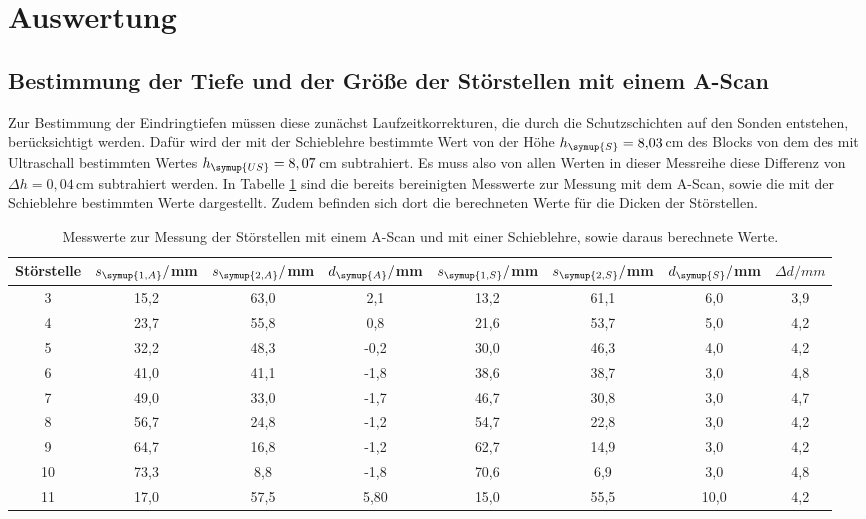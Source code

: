 \section{Auswertung}
\label{sec:Auswertung}

\subsection{Bestimmung der Tiefe und der Größe der Störstellen mit einem A-Scan}
\label{subsec:A_scan_störstellen}

Zur Bestimmung der Eindringtiefen müssen diese zunächst Laufzeitkorrekturen, die durch
die Schutzschichten auf den Sonden entstehen, berücksichtigt werden. Dafür wird der
mit der Schieblehre bestimmte Wert von der Höhe $h_{\symup{S}}=8{,}03\,$cm des Blocks
von dem des mit Ultraschall bestimmten Wertes $h_{\symup{US}}=8,07\,$cm subtrahiert.
Es muss also von allen Werten in dieser Messreihe diese Differenz von $\Delta h=0{,}04\,$cm
subtrahiert werden. In Tabelle \ref{tab:messwerte} sind die  bereits bereinigten
Messwerte zur Messung mit dem A-Scan, sowie die mit der Schieblehre bestimmten
Werte dargestellt. Zudem befinden sich dort die berechneten Werte für die Dicken
der Störstellen.

\begin{table}[htp]
	\begin{center}
    \caption{Messwerte zur Messung der Störstellen mit einem A-Scan und mit einer Schieblehre,
    sowie daraus berechnete Werte.}
    \label{tab:messwerte}
		\begin{tabular}{cccccccc}
		\toprule
			{Störstelle} & {$s_{\symup{1,A}}/$mm} & {$s_{\symup{2,A}}/$mm} & {$d_{\symup{A}}/$mm} &
      {$s_{\symup{1,S}}/$mm} & {$s_{\symup{2,S}}/$mm} & {$d_{\symup{S}}/$mm} & {$\Delta d/mm$}\\
			\midrule
			3   & 15,2 & 63,0 & 2,1 & 13,2 & 61,1 & 6,0 & 3,9\\
			4   & 23,7 & 55,8 & 0,8 & 21,6 & 53,7 & 5,0 & 4,2\\
			5   & 32,2 & 48,3 & -0,2 & 30,0 & 46,3 & 4,0 & 4,2\\
			6   & 41,0 & 41,1 & -1,8 & 38,6 & 38,7 & 3,0 & 4,8\\
			7   & 49,0 & 33,0 & -1,7 & 46,7 & 30,8 & 3,0 & 4,7\\
			8   & 56,7 & 24,8 & -1,2 & 54,7 & 22,8 & 3,0 & 4,2\\
			9   & 64,7 & 16,8 & -1,2 & 62,7 & 14,9 & 3,0 & 4,2\\
			10  & 73,3 & 8,8  & -1,8 & 70,6 & 6,9 & 3,0 & 4,8\\
			11  & 17,0 & 57,5 & 5,80 & 15,0 & 55,5 & 10,0 & 4,2\\
		\bottomrule
		\end{tabular}
	\end{center}
\end{table}

